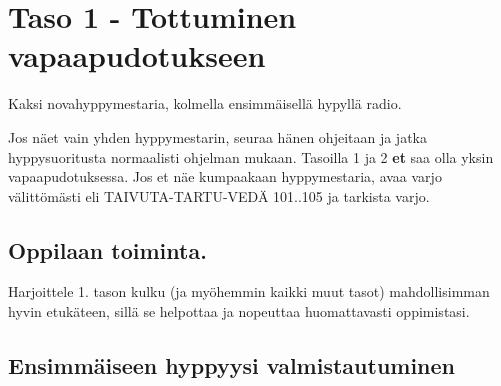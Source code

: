 \section{ Taso 1 - Tottuminen vapaapudotukseen }
\label{nova-alkeiskoulutuksen-suoritukset-taso-1-tottuminen-vapaapudotukseen}


Kaksi novahyppymestaria, kolmella ensimmäisellä hypyllä radio. 


Jos näet vain yhden hyppymestarin, seuraa hänen ohjeitaan ja jatka hyppysuoritusta normaalisti ohjelman mukaan. Tasoilla 1 ja 2 \textbf{et} saa olla yksin vapaapudotuksessa. Jos et näe kumpaakaan hyppymestaria, avaa varjo välittömästi eli TAIVUTA-TARTU-VEDÄ 101..105 ja tarkista varjo.  

\subsection{ Oppilaan toiminta. }
\label{nova-alkeiskoulutuksen-suoritukset-oppilaan-toiminta}


Harjoittele 1. tason kulku (ja myöhemmin kaikki muut tasot) mahdollisimman hyvin etukäteen, sillä se helpottaa ja nopeuttaa huomattavasti oppimistasi. 

\subsection{ Ensimmäiseen hyppyysi valmistautuminen }
\label{nova-alkeiskoulutuksen-suoritukset-ensimmaiseen-hyppyysi-valmistautuminen}

